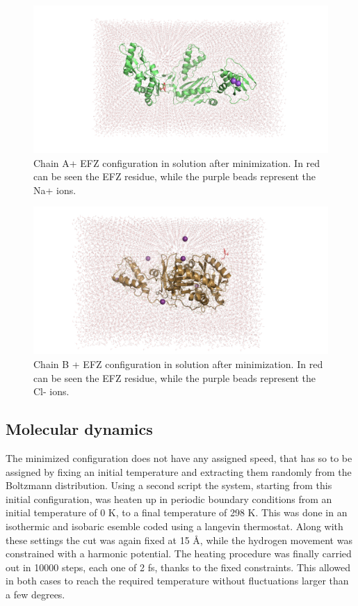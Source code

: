 \documentclass[12pt]{article}
\begin{document}
\begin{figure}
    \centering
    \includegraphics[width=0.7\linewidth, clip, trim= 200 20 160 20]{../figures/chain_a_efz_solv.png}
    \caption{Chain A+ EFZ configuration in solution after minimization. In red can be seen the EFZ residue, while the purple beads represent the Na+ ions.\label{fig:chain_a_efz_solv}}
\end{figure}

\begin{figure}
    \centering
    \includegraphics[width=0.7\linewidth, clip, trim= 135 20 180 20]{../figures/chain_b_efz_solv.png}
    \caption{Chain B + EFZ configuration in solution after minimization. In red can be seen the EFZ residue, while the purple beads represent the Cl- ions.\label{fig:chain_b_efz_solv}}
\end{figure}

\subsection{Molecular dynamics}
The minimized configuration does not have any assigned speed, that has so to be assigned by fixing an initial temperature and extracting them randomly from the Boltzmann distribution. Using a second script the system, starting from this initial configuration, was heaten up in periodic boundary conditions from an initial temperature of 0 K, to a final temperature of 298 K. This was done in an isothermic and isobaric esemble coded using a langevin thermostat. Along with these settings the cut was again fixed at 15 \AA, while the hydrogen movement was constrained with a harmonic potential.
The heating procedure was finally carried out in 10000 steps, each one of 2 fs, thanks to the fixed constraints. This allowed in both cases to reach the required temperature without fluctuations larger than a few degrees.
\end{document}
